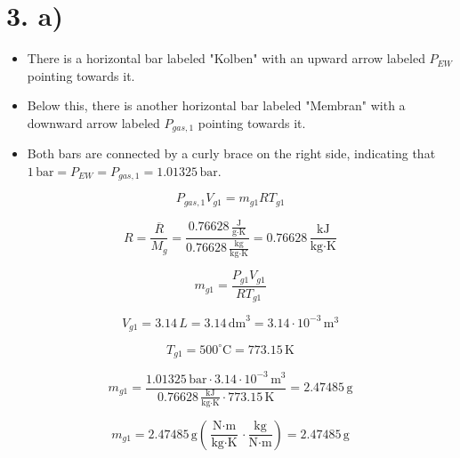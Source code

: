 \section*{3. a)}

\begin{itemize}
    \item There is a horizontal bar labeled "Kolben" with an upward arrow labeled $P_{EW}$ pointing towards it.
    \item Below this, there is another horizontal bar labeled "Membran" with a downward arrow labeled $P_{gas,1}$ pointing towards it.
    \item Both bars are connected by a curly brace on the right side, indicating that $1 \, \text{bar} = P_{EW} = P_{gas,1} = 1.01325 \, \text{bar}$.
\end{itemize}

\[
P_{gas,1} V_{g1} = m_{g1} R T_{g1}
\]

\[
R = \frac{\overline{R}}{M_g} = \frac{0.76628 \, \frac{\text{J}}{\text{g} \cdot \text{K}}}{0.76628 \, \frac{\text{kg}}{\text{kg} \cdot \text{K}}} = 0.76628 \, \frac{\text{kJ}}{\text{kg} \cdot \text{K}}
\]

\[
m_{g1} = \frac{P_{g1} V_{g1}}{R T_{g1}}
\]

\[
V_{g1} = 3.14 \, L = 3.14 \, \text{dm}^3 = 3.14 \cdot 10^{-3} \, \text{m}^3
\]

\[
T_{g1} = 500^\circ \text{C} = 773.15 \, \text{K}
\]

\[
m_{g1} = \frac{1.01325 \, \text{bar} \cdot 3.14 \cdot 10^{-3} \, \text{m}^3}{0.76628 \, \frac{\text{kJ}}{\text{kg} \cdot \text{K}} \cdot 773.15 \, \text{K}} = 2.47485 \, \text{g}
\]

\[
m_{g1} = 2.47485 \, \text{g} \left( \frac{\text{N} \cdot \text{m}}{\text{kg} \cdot \text{K}} \cdot \frac{\text{kg}}{\text{N} \cdot \text{m}} \right) = 2.47485 \, \text{g}
\]